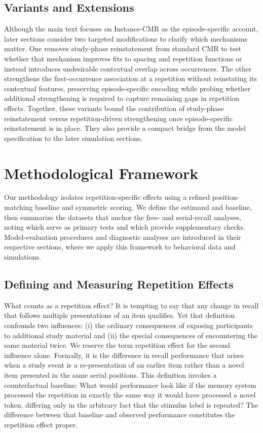 \documentclass[
  man,
  floatsintext,
  longtable,
  nolmodern,
  notxfonts,
  notimes,
  draftfirst,
  colorlinks=true,linkcolor=blue,citecolor=blue,urlcolor=blue]{apa7}
\begin{document}
\subsection{Variants and Extensions}\label{variants-and-extensions}

Although the main text focuses on Instance-CMR as the episode-specific
account, later sections consider two targeted modifications to clarify
which mechanisms matter. One removes study-phase reinstatement from
standard CMR to test whether that mechanism improves fits to spacing and
repetition functions or instead introduces undesirable contextual
overlap across occurrences. The other strengthens the first-occurrence
association at a repetition without reinstating its contextual features,
preserving episode-specific encoding while probing whether additional
strengthening is required to capture remaining gaps in repetition
effects. Together, these variants bound the contribution of study-phase
reinstatement versus repetition-driven strengthening once
episode-specific reinstatement is in place. They also provide a compact
bridge from the model specification to the later simulation sections.

\section{Methodological Framework}\label{methodological-framework}

Our methodology isolates repetition-specific effects using a refined
position-matching baseline and symmetric scoring. We define the estimand
and baseline, then summarize the datasets that anchor the free- and
serial-recall analyses, noting which serve as primary tests and which
provide supplementary checks. Model-evaluation procedures and diagnostic
analyses are introduced in their respective sections, where we apply
this framework to behavioral data and simulations.

\subsection{Defining and Measuring Repetition
Effects}\label{defining-and-measuring-repetition-effects}

What counts as a repetition effect? It is tempting to say that any
change in recall that follows multiple presentations of an item
qualifies. Yet that definition confounds two influences: (i) the
ordinary consequences of exposing participants to additional study
material and (ii) the special consequences of encountering the same
material twice. We reserve the term repetition effect for the second
influence alone. Formally, it is the difference in recall performance
that arises when a study event is a re-presentation of an earlier item
rather than a novel item presented in the same serial positions. This
definition invokes a counterfactual baseline: What would performance
look like if the memory system processed the repetition in exactly the
same way it would have processed a novel token, differing only in the
arbitrary fact that the stimulus label is repeated? The difference
between that baseline and observed performance constitutes the
repetition effect proper.
\end{document}
